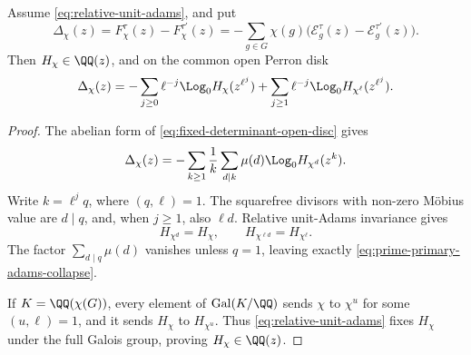 \begin{lemma}
\label{lem:prime-primary-adams-collapse}
Assume \eqref{eq:relative-unit-adams}, and put
\[
 \Delta_\chi(z)=F_\chi^\tau(z)-F_\chi^{\tau'}(z)
 =-\sum_{g\in G}\chi(g)
  \bigl(\mathcal E_g^\tau(z)-\mathcal E_g^{\tau'}(z)\bigr).
\]
Then \(H_\chi\in\QQ(z)\), and on the common open Perron disk
\begin{equation}\label{eq:prime-primary-adams-collapse}
 \Delta_\chi(z)
 =-\sum_{j\ge0}\ell^{-j}\Log_0H_\chi(z^{\ell^j})
  +\sum_{j\ge1}\ell^{-j}\Log_0H_{\chi^\ell}(z^{\ell^j}).
\end{equation}
\end{lemma}

\begin{proof}
The abelian form of \eqref{eq:fixed-determinant-open-disc} gives
\[
 \Delta_\chi(z)
 =-\sum_{k\ge1}\frac1k\sum_{d\mid k}\mu(d)
       \Log_0H_{\chi^d}(z^k).
\]
Write \(k=\ell^j q\), where \((q,\ell)=1\).  The squarefree divisors with
non-zero M\"obius value are \(d\mid q\), and, when \(j\ge1\), also
\(\ell d\).  Relative unit-Adams invariance gives
\[
 H_{\chi^d}=H_\chi,
 \qquad
 H_{\chi^{\ell d}}=H_{\chi^\ell}.
\]
The factor \(\sum_{d\mid q}\mu(d)\) vanishes unless \(q=1\), leaving
exactly \eqref{eq:prime-primary-adams-collapse}.

If \(K=\QQ(\chi(G))\), every element of \(\operatorname{Gal}(K/\QQ)\)
sends \(\chi\) to \(\chi^u\) for some \((u,\ell)=1\), and it sends
\(H_\chi\) to \(H_{\chi^u}\).  Thus \eqref{eq:relative-unit-adams} fixes
\(H_\chi\) under the full Galois group, proving
\(H_\chi\in\QQ(z)\).
\end{proof}

